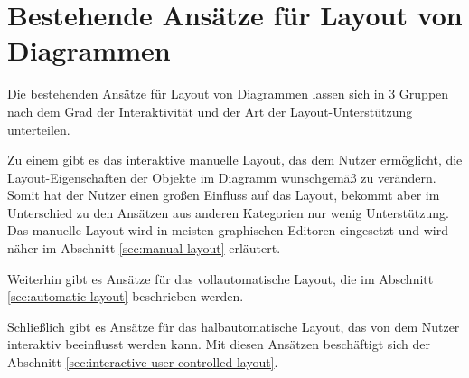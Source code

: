 
\chapter{Bestehende Ansätze für Layout von Diagrammen}

Die bestehenden Ansätze für Layout von Diagrammen lassen sich in 3 Gruppen nach dem Grad der Interaktivität und der Art der Layout-Unterstützung unterteilen.

Zu einem gibt es das interaktive manuelle Layout, das dem Nutzer ermöglicht, die Layout-Eigenschaften der Objekte im Diagramm wunschgemäß zu verändern. Somit hat der Nutzer einen großen Einfluss auf das Layout, bekommt aber im Unterschied zu den Ansätzen aus anderen Kategorien nur wenig Unterstützung. Das manuelle Layout wird in meisten graphischen Editoren eingesetzt und wird näher im Abschnitt \ref{sec:manual-layout} erläutert.

Weiterhin gibt es Ansätze für das vollautomatische Layout, die im Abschnitt \ref{sec:automatic-layout} beschrieben werden.

Schließlich gibt es Ansätze für das halbautomatische Layout, das von dem Nutzer interaktiv beeinflusst werden kann. Mit diesen Ansätzen beschäftigt sich der Abschnitt \ref{sec:interactive-user-controlled-layout}.




